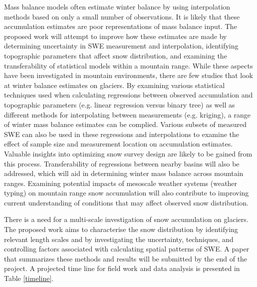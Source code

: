 \documentclass[12pt]{article}
\begin{document}
Mass balance models often estimate winter balance by using interpolation methods based on only a small number of observations. It is likely that these accumulation estimates are poor representations of mass balance input. The proposed work will attempt to improve how these estimates are made by determining uncertainty in SWE measurement and interpolation, identifying topographic parameters that affect snow distribution, and examining the transferability of statistical models within a mountain range. While these aspects have been investigated in mountain environments, there are few studies that look at winter balance estimates on glaciers. By examining various statistical techniques used when calculating regressions between observed accumulation and topographic parameters (e.g. linear regression versus binary tree) as well as different methods for interpolating between measurements (e.g. kriging), a range of winter mass balance estimates can be complied. Various subsets of measured SWE can also be used in these regressions and interpolations to examine the effect of sample size and measurement location on accumulation estimates. Valuable insights into optimizing snow survey design are likely to be gained from this process. Transferability of regressions between nearby basins will also be addressed, which will aid in determining winter mass balance across mountain ranges. Examining potential impacts of mesoscale weather systems (weather typing) on mountain range snow accumulation will also contribute to improving current understanding of conditions that may affect observed snow distribution. 

There is a need for a multi-scale investigation of snow accumulation on glaciers. The proposed work aims to characterise the snow distribution by identifying relevant length scales and by investigating the uncertainty, techniques, and controlling factors associated with calculating spatial patterns of SWE. A paper that summarizes these methods and results will be submitted by the end of the project. A projected time line for field work and data analysis is presented in Table \ref{timeline}.
\end{document}
